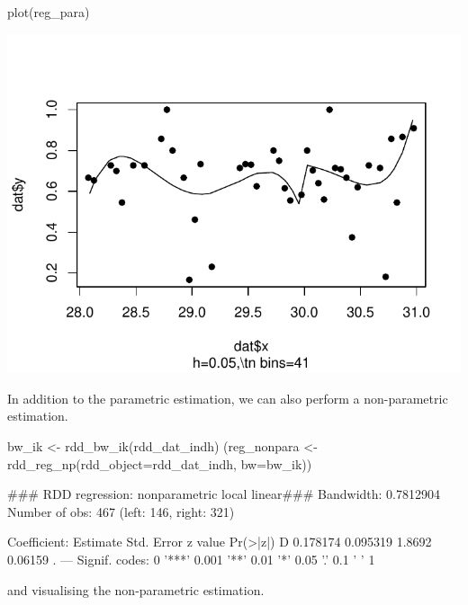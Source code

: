 \documentclass[article]{jss}
\begin{document}
\begin{CodeChunk}
\begin{CodeInput}
plot(reg_para)
\end{CodeInput}


\begin{center}\includegraphics{README_files/figure-latex/unnamed-chunk-9-1} \end{center}

\end{CodeChunk}

In addition to the parametric estimation, we can also perform a
non-parametric estimation.

\begin{CodeChunk}
\begin{CodeInput}
bw_ik <- rdd_bw_ik(rdd_dat_indh)
(reg_nonpara <- rdd_reg_np(rdd_object=rdd_dat_indh, bw=bw_ik))
\end{CodeInput}
\begin{CodeOutput}
### RDD regression: nonparametric local linear###
    Bandwidth:  0.7812904 
    Number of obs: 467 (left: 146, right: 321)

    Coefficient:
  Estimate Std. Error z value Pr(>|z|)  
D 0.178174   0.095319  1.8692  0.06159 .
---
Signif. codes:  0 '***' 0.001 '**' 0.01 '*' 0.05 '.' 0.1 ' ' 1
\end{CodeOutput}
\end{CodeChunk}

and visualising the non-parametric estimation.
\end{document}
